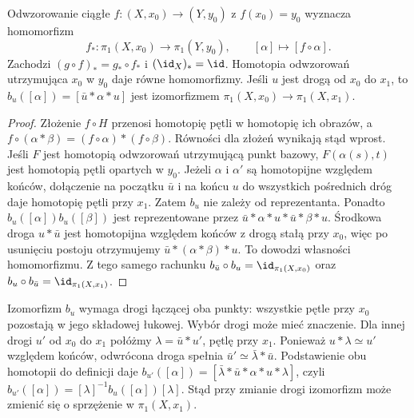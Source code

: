\begin{stwierdzenie}
\label{prop:pi1-funktor}
Odwzorowanie ciągłe $f:(X,x_0)\to(Y,y_0)$
z $f(x_0)=y_0$ wyznacza homomorfizm
\[
 f_*:\pi_1(X,x_0)\to\pi_1(Y,y_0),
 \qquad [\alpha]\mapsto[f\circ\alpha].
\]
Zachodzi $(g\circ f)_*=g_*\circ f_*$ i
$(\id_X)_*=\id$. Homotopia odwzorowań
utrzymująca $x_0$ w $y_0$ daje
równe homomorfizmy. Jeśli
$u$ jest drogą od $x_0$ do $x_1$,
to $b_u([\alpha])=[\bar u*\alpha*u]$
jest izomorfizmem
$\pi_1(X,x_0)\to\pi_1(X,x_1)$.
\end{stwierdzenie}
\begin{proof}
Złożenie $f\circ H$ przenosi homotopię
pętli w homotopię ich obrazów, a
$f\circ(\alpha*\beta)
=(f\circ\alpha)*(f\circ\beta)$.
Równości dla złożeń wynikają stąd wprost.
Jeśli $F$ jest homotopią odwzorowań utrzymującą
punkt bazowy, $F(\alpha(s),t)$ jest
homotopią pętli opartych w $y_0$.
Jeżeli $\alpha$ i $\alpha'$ są homotopijne
względem końców, dołączenie na początku
$\bar u$ i na końcu $u$ do wszystkich
pośrednich dróg daje homotopię pętli przy $x_1$.
Zatem $b_u$ nie zależy od reprezentanta.
Ponadto $b_u([\alpha])b_u([\beta])$ jest
reprezentowane przez
$\bar u*\alpha*u*\bar u*\beta*u$.
Środkowa droga $u*\bar u$ jest homotopijna
względem końców z drogą stałą przy $x_0$,
więc po usunięciu postoju otrzymujemy
$\bar u*(\alpha*\beta)*u$.
To dowodzi własności homomorfizmu.
Z tego samego rachunku
$b_{\bar u}\circ b_u=\id_{\pi_1(X,x_0)}$
oraz $b_u\circ b_{\bar u}=\id_{\pi_1(X,x_1)}$.
\end{proof}

Izomorfizm $b_u$ wymaga drogi łączącej oba punkty:
wszystkie pętle przy $x_0$ pozostają w jego
składowej łukowej. Wybór drogi może mieć znaczenie.
Dla innej drogi $u'$ od $x_0$ do $x_1$ połóżmy
$\lambda=\bar u*u'$, pętlę przy $x_1$.
Ponieważ $u*\lambda\simeq u'$ względem końców,
odwrócona droga spełnia
$\bar u'\simeq\bar\lambda*\bar u$.
Podstawienie obu homotopii do definicji daje
$b_{u'}([\alpha])=[\bar\lambda*\bar u*\alpha*u*\lambda]$,
czyli
$b_{u'}([\alpha])=[\lambda]^{-1}b_u([\alpha])[\lambda]$.
Stąd przy zmianie drogi izomorfizm może zmienić
się o sprzężenie w $\pi_1(X,x_1)$.

